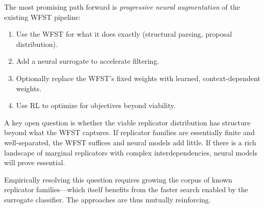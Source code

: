 \documentclass{article}
\begin{document}
The most promising path forward is \emph{progressive neural augmentation}
of the existing WFST pipeline:
\begin{enumerate}
  \item Use the WFST for what it does exactly (structural parsing, proposal
        distribution).
  \item Add a neural surrogate to accelerate filtering.
  \item Optionally replace the WFST's fixed weights with learned,
        context-dependent weights.
  \item Use RL to optimize for objectives beyond viability.
\end{enumerate}

A key open question is whether the viable replicator distribution has
structure beyond what the WFST captures.  If replicator families are
essentially finite and well-separated, the WFST suffices and neural
models add little.  If there is a rich landscape of marginal replicators
with complex interdependencies, neural models will prove essential.

Empirically resolving this question requires growing the corpus of
known replicator families---which itself benefits from the faster
search enabled by the surrogate classifier.  The approaches are thus
mutually reinforcing.
\end{document}
